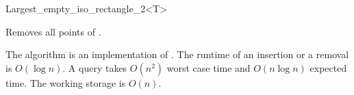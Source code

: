 \begin{ccRefClass}{Largest_empty_iso_rectangle_2<T>}


{Removes all points of \ccVar.}


\ccImplementation

The algorithm is an implementation of \cite{o-naler-90}. The runtime of an
insertion or a removal is $O(\log n)$. A query takes $O(n^2)$ worst
case time and $O(n \log n)$ expected time. The working storage is $
O(n)$.




\end{ccRefClass}


